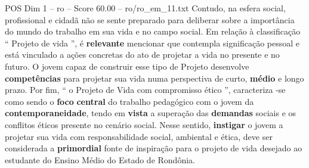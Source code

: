 \begin{textsample}{POS Dim 1 – ro – Score 60.00 – ro/ro\_em\_11.txt}
Contudo, na esfera social, profissional e cidadã não se sente preparado para deliberar sobre a importância do mundo do trabalho em sua vida e no campo social.
Em relação à classificação “ Projeto de vida ”, é \textbf{relevante} mencionar que contempla significação pessoal e está vinculado a ações concretas do ato de projetar a vida no presente e no futuro.
O jovem capaz de construir esse tipo de Projeto desenvolve \textbf{competências} para projetar sua vida numa perspectiva de curto, \textbf{médio} e longo prazo.
Por fim, “ o Projeto de Vida com compromisso ético ”, caracteriza -se como sendo o \textbf{foco} \textbf{central} do trabalho pedagógico com o jovem da \textbf{contemporaneidade}, tendo em \textbf{vista} a superação das \textbf{demandas} sociais e os conflitos éticos presente no cenário social.
Nesse sentido, \textbf{instigar} o jovem a projetar sua vida com responsabilidade social, ambiental e ética, deve ser considerada a \textbf{primordial} fonte de inspiração para o projeto de vida desejado ao estudante do Ensino Médio do Estado de Rondônia.

\end{textsample}
